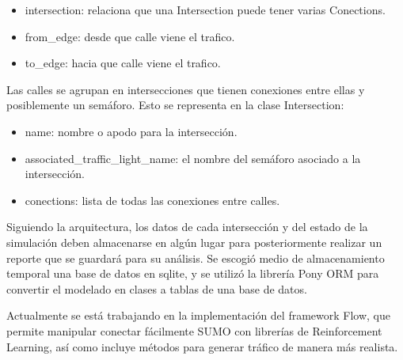 \begin{itemize}
\tightlist
\item
  intersection: relaciona que una Intersection puede tener varias
  Conections.
\item
  from\_edge: desde que calle viene el trafico.
\item
  to\_edge: hacia que calle viene el trafico.
\end{itemize}

Las calles se agrupan en intersecciones que tienen conexiones entre
ellas y posiblemente un semáforo. Esto se representa en la clase
Intersection:

\begin{itemize}
\tightlist
\item
  name: nombre o apodo para la intersección.
\item
  associated\_traffic\_light\_name: el nombre del semáforo asociado a la
  intersección.
\item
  conections: lista de todas las conexiones entre calles.
\end{itemize}

Siguiendo la arquitectura, los datos de cada intersección y del estado
de la simulación deben almacenarse en algún lugar para posteriormente
realizar un reporte que se guardará para su análisis. Se escogió medio
de almacenamiento temporal una base de datos en sqlite, y se utilizó la
librería Pony ORM para convertir el modelado en clases a tablas de una
base de datos.

Actualmente se está trabajando en la implementación del framework Flow,
que permite manipular conectar fácilmente SUMO con librerías de
Reinforcement Learning, así como incluye métodos para generar tráfico de
manera más realista.

\clearpage %
